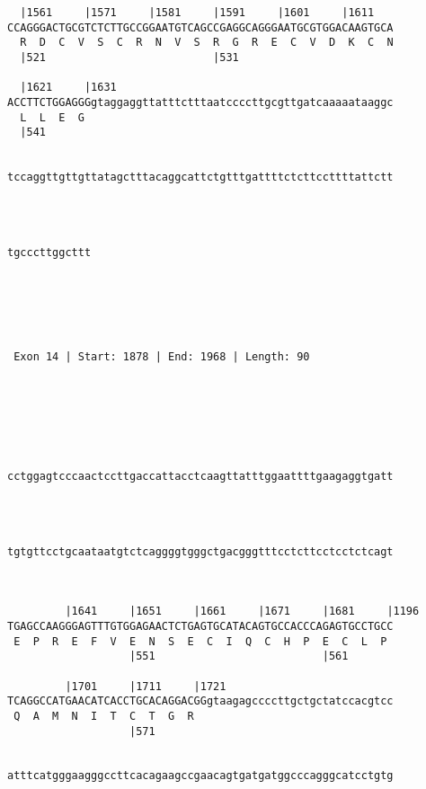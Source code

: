 \documentclass{article}
\begin{document}
\begin{Verbatim}
  |1561     |1571     |1581     |1591     |1601     |1611   
CCAGGGACTGCGTCTCTTGCCGGAATGTCAGCCGAGGCAGGGAATGCGTGGACAAGTGCA
  R  D  C  V  S  C  R  N  V  S  R  G  R  E  C  V  D  K  C  N
  |521                          |531                        
   
  |1621     |1631                                           
ACCTTCTGGAGGGgtaggaggttatttctttaatccccttgcgttgatcaaaaataaggc
  L  L  E  G                                                
  |541                                                      
   
                                                            
tccaggttgttgttatagctttacaggcattctgtttgattttctcttccttttattctt
                                                            
                                                            
   
             
tgcccttggcttt
             
             
  



 Exon 14 | Start: 1878 | End: 1968 | Length: 90 





   
                                                            
cctggagtcccaactccttgaccattacctcaagttatttggaattttgaagaggtgatt
                                                            
                                                            
   
                                                            
tgtgttcctgcaataatgtctcaggggtgggctgacgggtttcctcttcctcctctcagt
                                                            
                                                            
   
         |1641     |1651     |1661     |1671     |1681     |1196
TGAGCCAAGGGAGTTTGTGGAGAACTCTGAGTGCATACAGTGCCACCCAGAGTGCCTGCC
 E  P  R  E  F  V  E  N  S  E  C  I  Q  C  H  P  E  C  L  P 
                   |551                          |561       
   
         |1701     |1711     |1721                          
TCAGGCCATGAACATCACCTGCACAGGACGGgtaagagccccttgctgctatccacgtcc
 Q  A  M  N  I  T  C  T  G  R                               
                   |571                                     
   
                                                            
atttcatgggaagggccttcacagaagccgaacagtgatgatggcccagggcatcctgtg
                                                            

\end{Verbatim}
\end{document}
